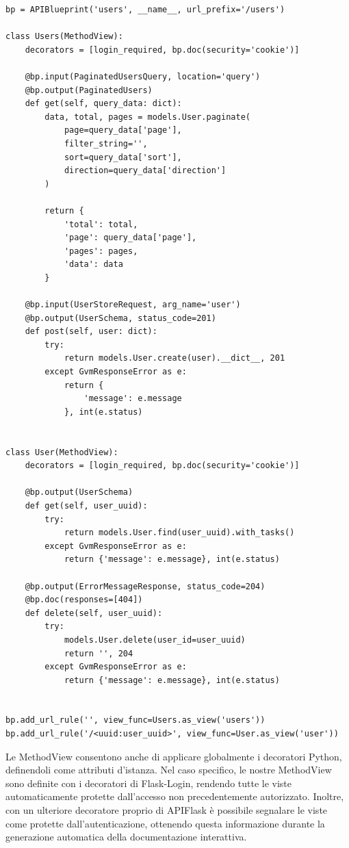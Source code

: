 \begin{lstlisting}[caption={Blueprint API e MethodView con decoratori comuni}, basicstyle=\ttfamily\footnotesize\color{one-text}]
bp = APIBlueprint('users', __name__, url_prefix='/users')

class Users(MethodView):
    decorators = [login_required, bp.doc(security='cookie')]
    
    @bp.input(PaginatedUsersQuery, location='query')
    @bp.output(PaginatedUsers)
    def get(self, query_data: dict):
        data, total, pages = models.User.paginate(
            page=query_data['page'],
            filter_string='',
            sort=query_data['sort'],
            direction=query_data['direction']
        )
    
        return {
            'total': total,
            'page': query_data['page'],
            'pages': pages,
            'data': data
        }
    
    @bp.input(UserStoreRequest, arg_name='user')
    @bp.output(UserSchema, status_code=201)
    def post(self, user: dict):
        try:
            return models.User.create(user).__dict__, 201
        except GvmResponseError as e:
            return {
                'message': e.message
            }, int(e.status)
    
    
class User(MethodView):
    decorators = [login_required, bp.doc(security='cookie')]
    
    @bp.output(UserSchema)
    def get(self, user_uuid):
        try:
            return models.User.find(user_uuid).with_tasks()
        except GvmResponseError as e:
            return {'message': e.message}, int(e.status)
    
    @bp.output(ErrorMessageResponse, status_code=204)
    @bp.doc(responses=[404])
    def delete(self, user_uuid):
        try:
            models.User.delete(user_id=user_uuid)
            return '', 204
        except GvmResponseError as e:
            return {'message': e.message}, int(e.status)


bp.add_url_rule('', view_func=Users.as_view('users'))
bp.add_url_rule('/<uuid:user_uuid>', view_func=User.as_view('user'))
\end{lstlisting}

Le MethodView consentono anche di applicare globalmente i decoratori Python, definendoli come attributi d'istanza. Nel caso specifico, le nostre MethodView sono definite con i decoratori di Flask-Login, rendendo tutte le viste automaticamente protette dall'accesso non precedentemente autorizzato. Inoltre, con un ulteriore decoratore proprio di APIFlask è possibile segnalare le viste come protette dall'autenticazione, ottenendo questa informazione durante la generazione automatica della documentazione interattiva.

